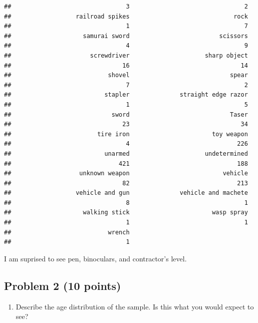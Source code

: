 \documentclass[
]{article}
\newenvironment{Shaded}{\begin{snugshade}}{\end{snugshade}}
\newcommand{\AttributeTok}[1]{\textcolor[rgb]{0.77,0.63,0.00}{#1}}
\newcommand{\DecValTok}[1]{\textcolor[rgb]{0.00,0.00,0.81}{#1}}
\newcommand{\FunctionTok}[1]{\textcolor[rgb]{0.00,0.00,0.00}{#1}}
\newcommand{\NormalTok}[1]{#1}
\newcommand{\SpecialCharTok}[1]{\textcolor[rgb]{0.00,0.00,0.00}{#1}}
\newcommand{\StringTok}[1]{\textcolor[rgb]{0.31,0.60,0.02}{#1}}
\providecommand{\tightlist}{%
  \setlength{\itemsep}{0pt}\setlength{\parskip}{0pt}}
\begin{document}
\begin{verbatim}
##                                3                                2 
##                  railroad spikes                             rock 
##                                1                                7 
##                    samurai sword                         scissors 
##                                4                                9 
##                      screwdriver                     sharp object 
##                               16                               14 
##                           shovel                            spear 
##                                7                                2 
##                          stapler              straight edge razor 
##                                1                                5 
##                            sword                            Taser 
##                               23                               34 
##                        tire iron                       toy weapon 
##                                4                              226 
##                          unarmed                     undetermined 
##                              421                              188 
##                   unknown weapon                          vehicle 
##                               82                              213 
##                  vehicle and gun              vehicle and machete 
##                                8                                1 
##                    walking stick                       wasp spray 
##                                1                                1 
##                           wrench 
##                                1
\end{verbatim}

I am suprised to see pen, binoculars, and contractor's level.

\hypertarget{problem-2-10-points}{%
\subsection{Problem 2 (10 points)}\label{problem-2-10-points}}

\begin{enumerate}
\def\labelenumi{\alph{enumi}.}
\tightlist
\item
  Describe the age distribution of the sample. Is this what you would
  expect to see?
\end{enumerate}

\begin{Shaded}
\end{Shaded}
\end{document}
